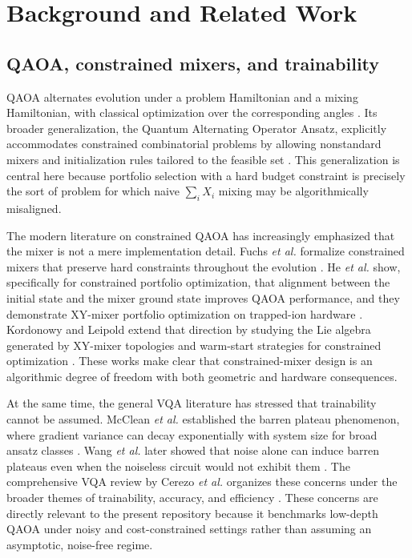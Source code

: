 \documentclass[11pt]{article}
\begin{document}
\section{Background and Related Work}\label{sec:background}

\subsection{QAOA, constrained mixers, and trainability}

QAOA alternates evolution under a problem Hamiltonian and a mixing Hamiltonian, with classical optimization over the corresponding angles \cite{farhi2014qaoa}. Its broader generalization, the Quantum Alternating Operator Ansatz, explicitly accommodates constrained combinatorial problems by allowing nonstandard mixers and initialization rules tailored to the feasible set \cite{hadfield2019qaoa}. This generalization is central here because portfolio selection with a hard budget constraint is precisely the sort of problem for which naive \(\sum_i X_i\) mixing may be algorithmically misaligned.

The modern literature on constrained QAOA has increasingly emphasized that the mixer is not a mere implementation detail. Fuchs \emph{et al.} formalize constrained mixers that preserve hard constraints throughout the evolution \cite{fuchs2022constrainedmixers}. He \emph{et al.} show, specifically for constrained portfolio optimization, that alignment between the initial state and the mixer ground state improves QAOA performance, and they demonstrate \(\mathrm{XY}\)-mixer portfolio optimization on trapped-ion hardware \cite{he2023alignment}. Kordonowy and Leipold extend that direction by studying the Lie algebra generated by \(\mathrm{XY}\)-mixer topologies and warm-start strategies for constrained optimization \cite{kordonowy2026lie}. These works make clear that constrained-mixer design is an algorithmic degree of freedom with both geometric and hardware consequences.

At the same time, the general VQA literature has stressed that trainability cannot be assumed. McClean \emph{et al.} established the barren plateau phenomenon, where gradient variance can decay exponentially with system size for broad ansatz classes \cite{mcclean2018barren}. Wang \emph{et al.} later showed that noise alone can induce barren plateaus even when the noiseless circuit would not exhibit them \cite{wang2021noisebarren}. The comprehensive VQA review by Cerezo \emph{et al.} organizes these concerns under the broader themes of trainability, accuracy, and efficiency \cite{cerezo2021vqa}. These concerns are directly relevant to the present repository because it benchmarks low-depth QAOA under noisy and cost-constrained settings rather than assuming an asymptotic, noise-free regime.
\end{document}
